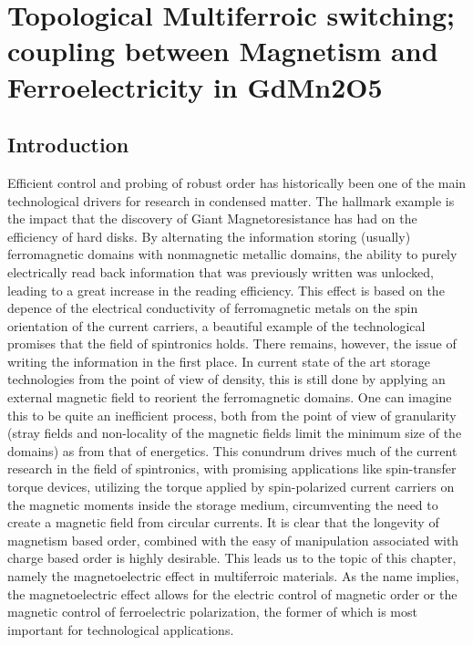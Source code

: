 \chapter{Topological Multiferroic switching; coupling between Magnetism and Ferroelectricity in GdMn2O5}
\section{Introduction}
Efficient control and probing of robust order has historically been one of the main technological drivers for research in condensed matter.
The hallmark example is the impact that the discovery of Giant Magnetoresistance has had on the efficiency of hard disks.
By alternating the information storing (usually) ferromagnetic domains with nonmagnetic metallic domains, the ability to purely electrically read back information that was previously written was unlocked, leading to a great increase in the reading efficiency.
This effect is based on the depence of the electrical conductivity of ferromagnetic metals on the spin orientation of the current carriers, a beautiful example of the technological promises that the field of spintronics holds.
There remains, however, the issue of writing the information in the first place.
In current state of the art storage technologies from the point of view of density, this is still done by applying an external magnetic field to reorient the ferromagnetic domains. One can imagine this to be quite an inefficient process, both from the point of view of granularity (stray fields and non-locality of the magnetic fields limit the minimum size of the domains) as from that of energetics.
This conundrum drives much of the current research in the field of spintronics, with promising applications like spin-transfer torque devices, utilizing the torque applied by spin-polarized current carriers on the magnetic moments inside the storage medium, circumventing the need to create a magnetic field from circular currents.
It is clear that the longevity of magnetism based order, combined with the easy of manipulation associated with charge based order is highly desirable.
This leads us to the topic of this chapter, namely the magnetoelectric effect in multiferroic materials.
As the name implies, the magnetoelectric effect allows for the electric control of magnetic order or the magnetic control of ferroelectric polarization\cite{Spaldin2019,Khomskii2009,Fiebig2005,Fiebig2016,Cheong2007}, the former of which is most important for technological applications.

